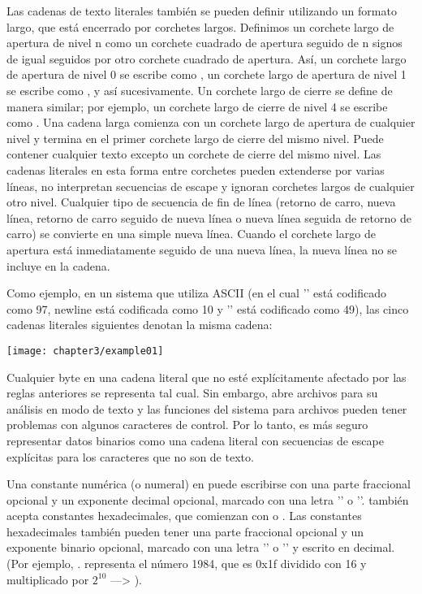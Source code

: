 Las cadenas de texto literales también se pueden definir utilizando un formato largo, que está encerrado por corchetes largos. Definimos un corchete largo de apertura de nivel n como un corchete cuadrado de apertura seguido de n signos de igual seguidos por otro corchete cuadrado de apertura. Así, un corchete largo de apertura de nivel 0 se escribe como \texthigh{[[}, un corchete largo de apertura de nivel 1 se escribe como \texthigh{[=[}, y así sucesivamente. Un corchete largo de cierre se define de manera similar; por ejemplo, un corchete largo de cierre de nivel 4 se escribe como \texthigh{]====]}. Una cadena larga comienza con un corchete largo de apertura de cualquier nivel y termina en el primer corchete largo de cierre del mismo nivel. Puede contener cualquier texto excepto un corchete de cierre del mismo nivel. Las cadenas literales en esta forma entre corchetes pueden extenderse por varias líneas, no interpretan secuencias de escape y ignoran corchetes largos de cualquier otro nivel. Cualquier tipo de secuencia de fin de línea (retorno de carro, nueva línea, retorno de carro seguido de nueva línea o nueva línea seguida de retorno de carro) se convierte en una simple nueva línea. Cuando el corchete largo de apertura está inmediatamente seguido de una nueva línea, la nueva línea no se incluye en la cadena.

Como ejemplo, en un sistema que utiliza ASCII (en el cual '' está codificado como 97, newline está codificada como 10 y '' está codificado como 49), las cinco cadenas literales siguientes denotan la misma cadena:

\texttt{[image: chapter3/example01]} %

Cualquier byte en una cadena literal que no esté explícitamente afectado por las reglas anteriores se representa tal cual. Sin embargo,  abre archivos para su análisis en modo de texto y las funciones del sistema para archivos pueden tener problemas con algunos caracteres de control. Por lo tanto, es más seguro representar datos binarios como una cadena literal con secuencias de escape explícitas para los caracteres que no son de texto.

Una constante numérica (o numeral) en  puede escribirse con una parte fraccional opcional y un exponente decimal opcional, marcado con una letra '' o ''.  también acepta constantes hexadecimales, que comienzan con  o . Las constantes hexadecimales también pueden tener una parte fraccional opcional y un exponente binario opcional, marcado con una letra '' o '' y escrito en decimal. (Por ejemplo, . representa el número 1984, que es 0x1f dividido con 16 y  multiplicado por $2^{10}$ ---> ).

